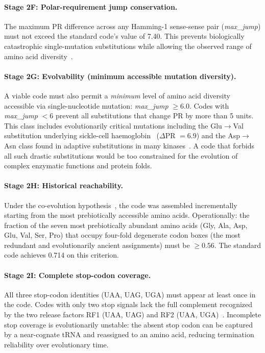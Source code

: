 \documentclass[10pt,twocolumn]{article}
\begin{document}
\paragraph{Stage 2F: Polar-requirement jump conservation.}
The maximum PR difference across any Hamming-1 sense-sense pair
(\emph{max\_jump}) must not exceed the standard code's value of 7.40. This
prevents biologically catastrophic single-mutation substitutions while allowing
the observed range of amino acid diversity~\cite{Zuckerkandl1965}.

\paragraph{Stage 2G: Evolvability (minimum accessible mutation diversity).}
\label{sec:2G}
A viable code must also permit a \emph{minimum} level of amino acid diversity
accessible via single-nucleotide mutation: \emph{max\_jump} $\geq 6.0$.
Codes with \emph{max\_jump} $<6$ prevent all substitutions that change PR by
more than 5 units. This class includes evolutionarily critical mutations
including the Glu$\to$Val substitution underlying sickle-cell
haemoglobin~\cite{Ingram1957} ($\Delta$PR $= 6.9$) and the Asp$\to$Asn class
found in adaptive substitutions in many kinases~\cite{Manning2002}. A code
that forbids all such drastic substitutions would be too constrained for the
evolution of complex enzymatic functions and protein folds.

\paragraph{Stage 2H: Historical reachability.}
Under the co-evolution hypothesis~\cite{Wong1975}, the code was assembled
incrementally starting from the most prebiotically accessible amino acids.
Operationally: the fraction of the seven most prebiotically abundant amino acids
(Gly, Ala, Asp, Glu, Val, Ser, Pro) that occupy four-fold degenerate codon
boxes (the most redundant and evolutionarily ancient assignments) must be
$\geq 0.56$. The standard code achieves 0.714 on this criterion.

\paragraph{Stage 2I: Complete stop-codon coverage.}
All three stop-codon identities (UAA, UAG, UGA) must appear at least once in
the code. Codes with only two stop signals lack the full complement recognized
by the two release factors RF1 (UAA, UAG) and RF2 (UAA, UGA)~\cite{Scolnick1968}.
Incomplete stop coverage is evolutionarily unstable: the absent stop codon can
be captured by a near-cognate tRNA and reassigned to an amino acid, reducing
termination reliability over evolutionary time.
\end{document}
